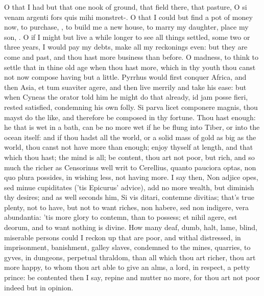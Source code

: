 {O that I had but that one nook of ground, that field there, that
pasture, O si venam argenti fors quis mihi monstret-. O that I could
but find a pot of money now, to purchase, \etc{}, to build me a new house,
to marry my daughter, place my son, \etc{}. O if I might but live a
while longer to see all things settled, some two or three years, I
would pay my debts, make all my reckonings even: but they are come and
past, and thou hast more business than before. O madness, to think to
settle that in thine old age when thou hast more, which in thy youth
thou canst not now compose having but a little. Pyrrhus would
first conquer Africa, and then Asia, et tum suaviter agere, and then
live merrily and take his ease: but when Cyneas the orator told him he
might do that already, id jam posse fieri, rested satisfied, condemning
his own folly. Si parva licet componere magnis, thou mayst do the like,
and therefore be composed in thy fortune. Thou hast enough: he that is
wet in a bath, can be no more wet if he be flung into Tiber, or into
the ocean itself: and if thou hadst all the world, or a solid mass of
gold as big as the world, thou canst not have more than enough; enjoy
thyself at length, and that which thou hast; the mind is all; be
content, thou art not poor, but rich, and so much the richer as
Censorinus well writ to Cerellius, quanto pauciora optas, non quo
plura possides, in wishing less, not having more. I say then, Non
adjice opes, sed minue cupiditates ('tis Epicurus' advice), add
no more wealth, but diminish thy desires; and as \Chrysostom well
seconds him, Si vis ditari, contemne divitias; that's true plenty, not
to have, but not to want riches, non habere, sed non indigere, vera
abundantia: 'tis more glory to contemn, than to possess; et nihil
agere, est deorum, and to want nothing is divine. How many deaf, dumb,
halt, lame, blind, miserable persons could I reckon up that are poor,
and withal distressed, in imprisonment, banishment, galley slaves,
condemned to the mines, quarries, to gyves, in dungeons, perpetual
thraldom, than all which thou art richer, thou art more happy, to whom
thou art able to give an alms, a lord, in respect, a petty prince:
be contented then I say, repine and mutter no more, for thou art
not poor indeed but in opinion.

}
